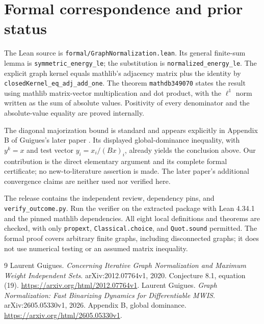 \documentclass[11pt]{article}
\begin{document}
\section{Formal correspondence and prior status}
The Lean source is \nolinkurl{formal/GraphNormalization.lean}. Its general finite-sum lemma is \nolinkurl{symmetric_energy_le}; the substitution is \nolinkurl{normalized_energy_le}. The explicit graph kernel equals mathlib's adjacency matrix plus the identity by \nolinkurl{closedKernel_eq_adj_add_one}. The theorem \nolinkurl{mathdb349070} states the result using mathlib matrix-vector multiplication and dot product, with the $\ell^1$ norm written as the sum of absolute values. Positivity of every denominator and the absolute-value equality are proved internally.

The diagonal majorization bound is standard and appears explicitly in Appendix B of Guigues's later paper \cite{later}. Its displayed global-dominance inequality, with $y^k=x$ and test vector $y_i=x_i/(Bx)_i$, already yields the conclusion above. Our contribution is the direct elementary argument and its complete formal certificate; no new-to-literature assertion is made. The later paper's additional convergence claims are neither used nor verified here.

The release contains the independent review, dependency pins, and \nolinkurl{verify_outcome.py}. Run the verifier on the extracted package with Lean 4.34.1 and the pinned mathlib dependencies. All eight local definitions and theorems are checked, with only \nolinkurl{propext}, \nolinkurl{Classical.choice}, and \nolinkurl{Quot.sound} permitted. The formal proof covers arbitrary finite graphs, including disconnected graphs; it does not use numerical testing or an assumed matrix inequality.
\begin{thebibliography}{9}
 Laurent Guigues. \emph{Concerning Iterative Graph Normalization and Maximum Weight Independent Sets}. arXiv:2012.07764v1, 2020. Conjecture 8.1, equation (19). \url{https://arxiv.org/html/2012.07764v1}.
 Laurent Guigues. \emph{Graph Normalization: Fast Binarizing Dynamics for Differentiable MWIS}. arXiv:2605.05330v1, 2026. Appendix B, global dominance. \url{https://arxiv.org/html/2605.05330v1}.
\end{thebibliography}
\end{document}

